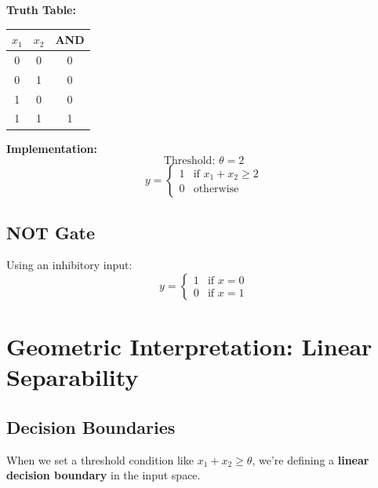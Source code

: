 \begin{minipage}{0.45\textwidth}
\textbf{Truth Table:}
\begin{center}
\begin{tabular}{|c|c|c|}
\hline
$x_1$ & $x_2$ & AND \\ \hline
0 & 0 & 0 \\ \hline
0 & 1 & 0 \\ \hline
1 & 0 & 0 \\ \hline
1 & 1 & 1 \\ \hline
\end{tabular}
\end{center}
\end{minipage}
\hfill
\begin{minipage}{0.45\textwidth}
\textbf{Implementation:}
\[
\text{Threshold: } \theta = 2
\]
\[
y = \begin{cases} 1 & \text{if } x_1 + x_2 \geq 2 \\ 0 & \text{otherwise} \end{cases}
\]
\end{minipage}

\subsection{NOT Gate}

Using an inhibitory input:
\[
y = \begin{cases} 1 & \text{if } x = 0 \\ 0 & \text{if } x = 1 \end{cases}
\]


\section{Geometric Interpretation: Linear Separability}

\subsection{Decision Boundaries}

When we set a threshold condition like $x_1 + x_2 \geq \theta$, we're defining a \textbf{linear decision boundary} in the input space.

